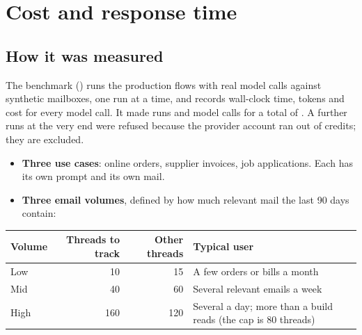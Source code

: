 \section{Cost and response time}
\label{sec:cost}


\subsection{How it was measured}
\label{sec:method}

The benchmark () runs the production flows with real model
calls against synthetic mailboxes, one run at a time, and records wall-clock time, tokens and
cost for every model call. It made \Nnruns{} runs and \Nllmcalls{} model calls for a total of
\Nbenchcost{}. A further \Nnnocredit{} runs at the very end were refused because the provider
account ran out of credits; they are excluded.

\begin{itemize}
\item \textbf{Three use cases}: online orders, supplier invoices, job applications. Each has its own prompt and its own mail.
\item \textbf{Three email volumes}, defined by how much relevant mail the last 90 days contain:
\end{itemize}

\begin{center}\small
\begin{tabularx}{0.92\linewidth}{@{}P{2.2cm}rrL@{}}
\toprule
\textbf{Volume} & \textbf{Threads to track} & \textbf{Other threads} & \textbf{Typical user} \\
\midrule
Low & 10 & 15 & A few orders or bills a month \\
Mid & 40 & 60 & Several relevant emails a week \\
High & 160 & 120 & Several a day; more than a build reads (the cap is 80 threads) \\
\bottomrule
\end{tabularx}
\end{center}

